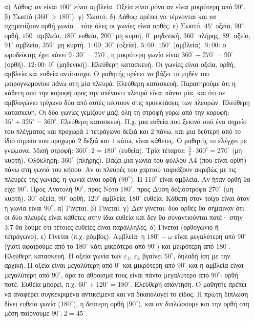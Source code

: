  α) Λάθος: αν είναι $100^\circ$ είναι αμβλεία. Οξεία είναι μόνο αν είναι μικρότερη από $90^\circ$. β) Σωστό ($360^\circ>180^\circ$). γ) Σωστό. δ) Λάθος: πρέπει να τέμνονται και να σχηματίζουν ορθή γωνία· τότε όλες οι γωνίες είναι ορθές. ε) Σωστό.
 $45^\circ$ οξεία, $90^\circ$ ορθή, $150^\circ$ αμβλεία, $180^\circ$ ευθεία, $200^\circ$ μη κυρτή, $0^\circ$ μηδενική, $360^\circ$ πλήρης, $89^\circ$ οξεία, $91^\circ$ αμβλεία, $359^\circ$ μη κυρτή.
 $1{:}00$: $30^\circ$ (οξεία). $5{:}00$: $150^\circ$ (αμβλεία). $9{:}00$: ο ωροδείκτης έχει κάνει $9\cdot30^\circ=270^\circ$, η μικρότερη γωνία είναι $360^\circ-270^\circ=90^\circ$ (ορθή). $12{:}00$: $0^\circ$ (μηδενική).
 Ελεύθερη κατασκευή. Οι γωνίες είναι οξεία, ορθή, αμβλεία και ευθεία αντίστοιχα. Ο μαθητής πρέπει να βάζει το μηδέν του μοιρογνωμονίου πάνω στη μία πλευρά.
 Ελεύθερη κατασκευή. Παρατηρούμε ότι η κάθετη από την κορυφή προς την απέναντι πλευρά είναι πάντα μία, και ότι σε αμβλυγώνιο τρίγωνο δύο από αυτές πέφτουν στις προεκτάσεις των πλευρών.
 Ελεύθερη κατασκευή. Οι δύο γωνίες γεμίζουν μαζί όλη τη στροφή γύρω από την κορυφή: $35^\circ+325^\circ=360^\circ$.
 Ελεύθερη κατασκευή. Π.χ. μια ευθεία που ξεκινά από ένα σημείο του πλέγματος και προχωρά $1$ τετράγωνο δεξιά και $2$ πάνω, και μια δεύτερη από το ίδιο σημείο που προχωρά $2$ δεξιά και $1$ κάτω, είναι κάθετες. Ο μαθητής το ελέγχει με γνώμονα.
 Μισή στροφή: $360^\circ:2=180^\circ$ (ευθεία). Τρία τέταρτα: $\frac{3}{4}\cdot360^\circ=270^\circ$ (μη κυρτή). Ολόκληρη: $360^\circ$ (πλήρης).
 Βάζει μια γωνία του φύλλου Α4 (που είναι ορθή) πάνω στη γωνιά του κήπου. Αν οι πλευρές του χαρτιού ταιριάζουν ακριβώς με τις πλευρές της γωνιάς, η γωνιά είναι ορθή ($90^\circ$).
 Η $110^\circ$ είναι αμβλεία. Αν ήταν ορθή θα είχε $90^\circ$.
 Προς Ανατολή $90^\circ$, προς Νότο $180^\circ$, προς Δύση δεξιόστροφα $270^\circ$ (μη κυρτή).
 $30^\circ$ οξεία, $90^\circ$ ορθή, $120^\circ$ αμβλεία, $180^\circ$ ευθεία. Κάθετη στον τοίχο είναι όταν η γωνία είναι $90^\circ$.
 α) Γίνεται. β) Γίνεται. γ) Δεν γίνεται: δύο ορθές θα σήμαιναν ότι οι δύο πλευρές είναι κάθετες στην ίδια ευθεία και δεν θα συναντιούνται ποτέ· στην 3.7 θα δούμε ότι τέτοιες ευθείες είναι παράλληλες. δ) Γίνεται (ορθογώνιο ή τετράγωνο). ε) Γίνεται (π.χ. ρόμβος).
 Αμβλεία: η $180^\circ-\omega$ είναι μεγαλύτερη από $90^\circ$ (γιατί αφαιρούμε από το $180^\circ$ κάτι μικρότερο από $90^\circ$) και μικρότερη από $180^\circ$.
 Ελεύθερη κατασκευή. Η οξεία γωνία των $\varepsilon_1$, $\varepsilon_2$ βγαίνει $50^\circ$, δηλαδή ίση με την αρχική.
 Η οξεία είναι μεγαλύτερη από $0^\circ$ και μικρότερη από $90^\circ$ και η αμβλεία είναι μεγαλύτερη από $90^\circ$, άρα το άθροισμά τους είναι πάντα μεγαλύτερο από $90^\circ$: ορθή ποτέ. Ευθεία μπορεί, π.χ. $60^\circ+120^\circ=180^\circ$.
 Ελεύθερη απάντηση. Ο μαθητής πρέπει να αναφέρει συγκεκριμένα αντικείμενα και να δικαιολογεί το είδος.
 Η πρώτη δίπλωση δίνει ευθεία γωνία ($180^\circ$), η δεύτερη ορθή ($90^\circ$), και αν διπλώσουμε και την ορθή στη μέση παίρνουμε $90^\circ:2=45^\circ$.
